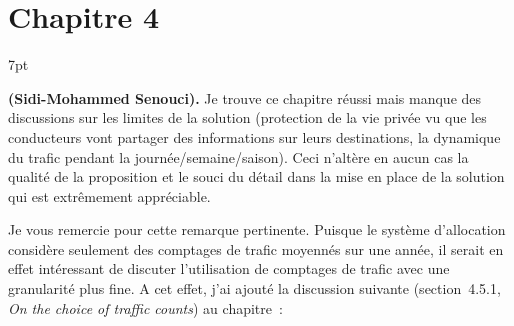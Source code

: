 \documentclass[11pt]{article}
\newenvironment{formal}{%
  \vspace*{-5pt}
  \def\FrameCommand{%
    \hspace{-5pt}%
    {\color{gray50}\vrule width 1.25pt}%
    \colorbox{formalcolor}%
  }%
  \MakeFramed{\advance\hsize-\width\FrameRestore}%
  \noindent\hspace{-4.55pt}%
  \begin{adjustwidth}{}{7pt}%
  \normalsize
  \vspace{-2pt}
}
{%
  \vspace{2pt}\end{adjustwidth}\endMakeFramed%
  \vspace*{-10pt}
}
\begin{document}
\section{Chapitre 4}

\begin{formal}
\textbf{(Sidi-Mohammed Senouci).} Je trouve ce chapitre réussi mais manque des discussions sur les limites de la solution (protection de la vie privée vu que les conducteurs vont partager des informations sur leurs destinations, la dynamique du trafic pendant la journée/semaine/saison). Ceci n’altère en aucun cas la qualité de la proposition et le souci du détail dans la mise en place de la solution qui est extrêmement appréciable.
\end{formal}

Je vous remercie pour cette remarque pertinente. Puisque le système d'allocation considère seulement des comptages de trafic moyennés sur une année, il serait en effet intéressant de discuter l'utilisation de comptages de trafic avec une granularité plus fine. A cet effet, j'ai ajouté la discussion suivante (section~4.5.1, \textit{On the choice of traffic counts}) au chapitre~:
\end{document}
